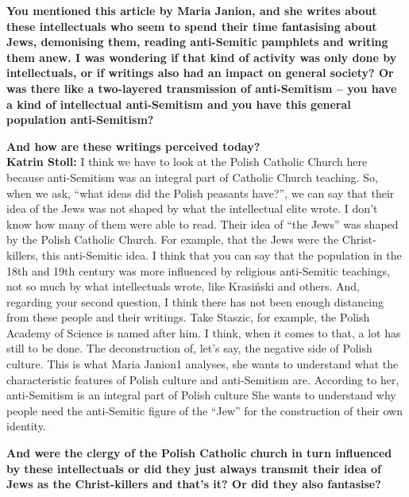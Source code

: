 \textbf{You mentioned this article by Maria Janion, and she writes about these intellectuals who seem to spend their time fantasising about Jews, demonising them, reading anti-Semitic pamphlets and writing them anew. I was wondering if that kind of activity was only done by intellectuals, or if writings also had an impact on general society? Or was there like a two-layered transmission of anti-Semitism – you have a kind of intellectual anti-Semitism and you have this general population anti-Semitism?}\par
\textbf{And how are these writings perceived today?}\\ 

\textbf{Katrin Stoll:} I think we have to look at the Polish Catholic Church here because anti-Semitism was an integral part of Catholic Church teaching. So, when we ask, "`what ideas did the Polish peasants have?"', we can say that their idea of the Jews was not shaped by what the intellectual elite wrote. I don’t know how many of them were able to read. Their idea of "`the Jews"' was shaped by the Polish Catholic Church. For example, that the Jews were the Christ-killers, this anti-Semitic idea. I think that you can say that the population in the 18th and 19th century was more influenced by religious anti-Semitic teachings, not so much by what intellectuals wrote, like Krasiński and others. And, regarding your second question, I think there has not been enough distancing from these people and their writings. Take Staszic, for example, the Polish Academy of Science is named after him. I think, when it comes to that, a lot has still to be done. The deconstruction of, let’s say, the negative side of Polish culture. This is what Maria Janion1 analyses, she wants to understand what the characteristic features of Polish culture and anti-Semitism are. According to her, anti-Semitism is an integral part of Polish culture She wants to understand why people need the anti-Semitic figure of the "`Jew"' for the construction of their own identity. 

\textbf{And were the clergy of the Polish Catholic church in turn influenced by these intellectuals or did they just always transmit their idea of Jews as the Christ-killers and that’s it? Or did they also fantasise?}

